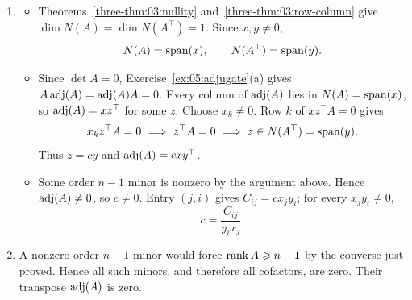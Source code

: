 \begin{solution}
\begin{enumerate}
\item
\begin{itemize}
\item Theorems~\ref{three-thm:03:nullity} and~\ref{three-thm:03:row-column} give
\(\dim N(A)=\dim N(A^\top)=1\). Since \(x,y\ne0\),
\[
N(A)=\operatorname{span}(x),\qquad N(A^\top)=\operatorname{span}(y).
\]
\item Since \(\det A=0\), Exercise~\ref{ex:05:adjugate}(a) gives
\(A\operatorname{adj}(A)=\operatorname{adj}(A)A=0\). Every column of \(\operatorname{adj}(A)\) lies in
\(N(A)=\operatorname{span}(x)\), so \(\operatorname{adj}(A)=xz^\top\) for some \(z\).
Choose \(x_k\ne0\). Row \(k\) of \(xz^\top A=0\) gives
\[
x_kz^\top A=0\ \Longrightarrow\ z^\top A=0
\ \Longrightarrow\ z\in N(A^\top)=\Span(y).
\]
Thus \(z=cy\) and \(\operatorname{adj}(A)=cxy^\top\).
\item Some order \(n-1\) minor is nonzero by the argument above.
Hence \(\operatorname{adj}(A)\ne0\), so \(c\ne0\). Entry \((j,i)\) gives
\(C_{ij}=cx_jy_i\); for every \(x_jy_i\ne0\),
\[
c=\frac{C_{ij}}{y_i x_j}.
\]
\end{itemize}
\item A nonzero order \(n-1\) minor would force \(\operatorname{rank} A\geqslant n-1\)
by the converse just proved. Hence all such minors, and therefore all
cofactors, are zero. Their transpose \(\operatorname{adj}(A)\) is zero.
\end{enumerate}
\end{solution}

